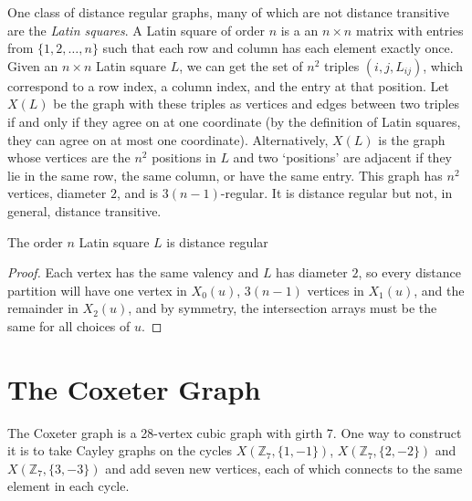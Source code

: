 One class of distance regular graphs, many of which are not distance transitive are the \textit{Latin squares}.  A Latin square of order $n$ is a an $n{\times}n$ matrix with entries from $\{1,2,\dots,n\}$ such that each row and column has each element exactly once.  Given an $n{\times}n$ Latin square $L$, we can get the set of $n^2$ triples $(i,j,L_{ij})$, which correspond to a row index, a column index, and the entry at that position.  Let $X(L)$ be the graph with these triples as vertices and edges between two triples if and only if they agree on at one coordinate (by the definition of Latin squares, they can agree on at most one coordinate).  Alternatively, $X(L)$ is the graph whose vertices are the $n^2$ positions in $L$ and two `positions' are adjacent if they lie in the same row, the same column, or have the same entry.  This graph has $n^2$ vertices, diameter $2$, and is $3(n-1)$-regular.  It is distance regular but not, in general, distance transitive.

\begin{lemma}
	The order $n$ Latin square $L$ is distance regular
\end{lemma}
\begin{proof}
	Each vertex has the same valency and $L$ has diameter $2$, so every distance partition will have one vertex in $X_0(u)$, $3(n-1)$ vertices in $X_1(u)$, and the remainder in $X_2(u)$, and by symmetry, the intersection arrays must be the same for all choices of $u$.
\end{proof}

\section*{The Coxeter Graph}

The Coxeter graph is a 28-vertex cubic graph with girth 7.  One way to construct it is to take Cayley graphs on the cycles $X(\mathbb{Z}_7,\{1,-1\})$, $X(\mathbb{Z}_7,\{2,-2\})$ and $X(\mathbb{Z}_7,\{3,-3\})$ and add seven new vertices, each of which connects to the same element in each cycle.


